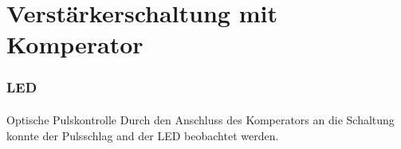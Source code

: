 \section{Verstärkerschaltung mit Komperator} %
\label{sec:Verstärkerschaltung mit Komperator}
\begin{frame}
\frametitle{LED}
\framesubtitle{}
    \begin{block}{Optische Pulskontrolle}
        Durch den Anschluss des Komperators an die Schaltung konnte der
        Pulsschlag and der LED beobachtet werden. 
    \end{block}
\end{frame}

